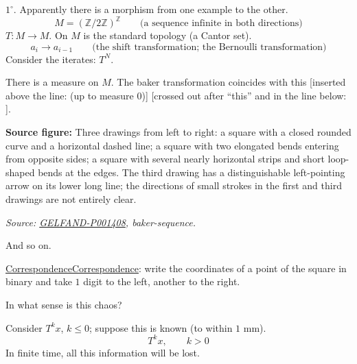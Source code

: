 \documentclass[11pt]{article}
\theoremstyle{definition}
\theoremstyle{remark}
\let\DiplomaticMathUnderline\underline
\renewcommand{\underline}[1]{\ifmmode\DiplomaticMathUnderline{#1}\else\uline{#1}\fi}
\providecommand{\EnglishUnclear}[3]{%
\begingroup\color{orange!65!black}%
\ifmmode\text{[unclear: #3]}\else[unclear: #3]\fi\endgroup}
\providecommand{\EnglishSourceFigure}[3]{%
\par\noindent\begingroup\color{blue!55!black}\textbf{Source figure:} #3\par
{\footnotesize\textit{Source: \hyperref[#1:source-page]{#1}, #2.}}\endgroup\par}
\begin{document}
$1^{\circ}$. Apparently there is a morphism from one example to the other.
\begin{equation*}
M=(\mathbb{Z}/2\mathbb{Z})^{\mathbb{Z}}
\qquad\text{(a sequence infinite in both directions)}
\end{equation*}
$T\colon M\to M$. On $M$ is the standard topology (a Cantor set).
\begin{equation*}
a_i\to a_{i-1}\qquad\text{(the shift transformation; the Bernoulli transformation)}
\end{equation*}
Consider the iterates: $T^N$.

There is a measure on $M$. The baker transformation coincides with this
[inserted above the line: (up to measure $0$)]
[crossed out after ``this'' and in the line below:
\EnglishUnclear{GELFAND-P001408}{baker-cancellations}{illegible}].

\begin{center}
\end{center}

\EnglishSourceFigure{GELFAND-P001408}{baker-sequence}{Three drawings from left to right: a square with a closed rounded curve and a horizontal dashed line; a square with two elongated bends entering from opposite sides; a square with several nearly horizontal strips and short loop-shaped bends at the edges. The third drawing has a distinguishable left-pointing arrow on its lower long line; the directions of small strokes in the first and third drawings are not entirely clear.}


And so on.

\underline{Correspondence}: write the coordinates of a point of the square in binary
and take $1$ digit to the left, another to the right.

In what sense is this chaos?

Consider $T^k x$, $k\leq 0$; suppose this is known (to within $1$ mm).
\begin{equation*}
T^k x,\qquad k>0
\end{equation*}
In finite time, all this information will be lost.
\end{document}
